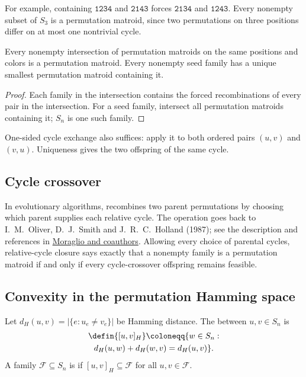 For example, containing $\mathtt{1234}$ and $\mathtt{2143}$ forces
$\mathtt{2134}$ and $\mathtt{1243}$. Every nonempty subset of $S_3$
is a permutation matroid, since two permutations on three positions
differ on at most one nontrivial cycle.

\begin{corollary}
Every nonempty intersection of permutation matroids on the same positions
and colors is a permutation matroid. Every nonempty seed family has a
unique smallest permutation matroid containing it.
\end{corollary}

\begin{proof}
Each family in the intersection contains the forced recombinations of
every pair in the intersection. For a seed family, intersect all
permutation matroids containing it; $S_n$ is one such family.
\end{proof}

One-sided cycle exchange also suffices: apply it to both ordered pairs
$(u,v)$ and $(v,u)$. Uniqueness gives the two offspring of the same cycle.

\subsection[cycleCrossover]{Cycle crossover}

In evolutionary algorithms,  recombines two parent
permutations by choosing which parent supplies each relative cycle.
The operation goes back to I.~M.~Oliver, D.~J.~Smith and J.~R.~C.~Holland
(1987); see the description and references in
\href{https://eden.dei.uc.pt/~moraglio/ppsn-workshop.pdf}{Moraglio and
coauthors}. Allowing every choice of parental cycles, relative-cycle
closure says exactly that a nonempty family is a permutation matroid
if and only if every cycle-crossover offspring remains feasible.

\subsection[hammingConvexity]{Convexity in the permutation Hamming space}

Let $d_H(u,v)=|\{e:u_e\ne v_e\}|$ be Hamming distance. The
 between $u,v\in S_n$ is
\[
 \begin{gathered}
 \defin{[u,v]_H}\coloneqq\{w\in S_n:\\
 d_H(u,w)+d_H(w,v)=d_H(u,v)\}.
 \end{gathered}
\]
A family $\mathcal F\subseteq S_n$ is  if
$[u,v]_H\subseteq\mathcal F$ for all $u,v\in\mathcal F$.

